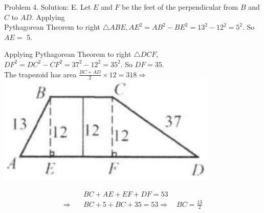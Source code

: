 \documentclass[10pt]{article}
\begin{document}
Problem 4. Solution: E.
Let \(E\) and \(F\) be the feet of the perpendicular from \(B\) and \(C\) to \(A D\). Applying\\
Pythagorean Theorem to right \(\triangle A B E, A E^{2}=A B^{2}-B E^{2}=13^{2}-12^{2}=5^{2}\). So \(A E=\) 5.

Applying Pythagorean Theorem to right \(\triangle D C F\), \(D F^{2}=D C^{2}-C F^{2}=37^{2}-12^{2}=35^{2}\). So \(D F=35\).\\
The trapezoid has area \(\frac{B C+A D}{2} \times 12=318 \Rightarrow\)\\
\includegraphics[max width=\textwidth, center]{2025_04_17_97bc1f7e44d93c271a88g-093(3)}

\[
\begin{aligned}
& B C+A E+E F+D F=53 \\
\Rightarrow \quad & B C+5+B C+35=53 \Rightarrow \quad B C=\frac{13}{2}
\end{aligned}
\]
\end{document}
